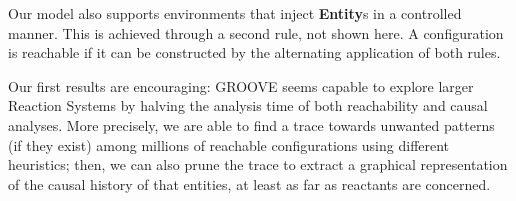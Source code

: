 \documentclass{llncs}
\newcommand{\lab}[1]{\textsf{#1}}
\newcommand{\blab}[1]{\lab{\bfseries #1}}
\begin{document}
Our model also supports environments that inject \blab{Entity}s in a controlled manner. This is achieved through a second rule, not shown here. A configuration is reachable if it can be constructed by the alternating application of both rules.

\medskip\noindent
Our first results are encouraging: GROOVE seems capable to explore larger Reaction Systems 
by halving the analysis time of both reachability and causal analyses.
More precisely, we are able to find a trace towards unwanted patterns (if they exist) among millions of reachable configurations using different heuristics; then, we can also prune the trace to extract a graphical representation of the causal history of that entities, at least as far as reactants are concerned.

%
%


%
\end{document}
